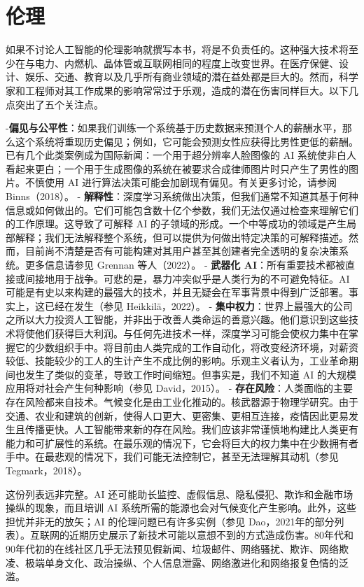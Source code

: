 \section{伦理}
如果不讨论人工智能的伦理影响就撰写本书，将是不负责任的。这种强大技术将至少在与电力、内燃机、晶体管或互联网相同的程度上改变世界。在医疗保健、设计、娱乐、交通、教育以及几乎所有商业领域的潜在益处都是巨大的。然而，科学家和工程师对其工作成果的影响常常过于乐观，造成的潜在伤害同样巨大。以下几点突出了五个关注点。

-\textbf{偏见与公平性}：如果我们训练一个系统基于历史数据来预测个人的薪酬水平，那么这个系统将重现历史偏见；例如，它可能会预测女性应获得比男性更低的薪酬。已有几个此类案例成为国际新闻：一个用于超分辨率人脸图像的 AI 系统使非白人看起来更白；一个用于生成图像的系统在被要求合成律师图片时只产生了男性的图片。不慎使用 AI 进行算法决策可能会加剧现有偏见。有关更多讨论，请参阅 Binns（2018）。
- \textbf{解释性}：深度学习系统做出决策，但我们通常不知道其基于何种信息或如何做出的。它们可能包含数十亿个参数，我们无法仅通过检查来理解它们的工作原理。这导致了可解释 AI 的子领域的形成。一个中等成功的领域是产生局部解释；我们无法解释整个系统，但可以提供为何做出特定决策的可解释描述。然而，目前尚不清楚是否有可能构建对其用户甚至其创建者完全透明的复杂决策系统。更多信息请参见 Grennan 等人（2022）。
- \textbf{武器化 AI}：所有重要技术都被直接或间接地用于战争。可悲的是，暴力冲突似乎是人类行为的不可避免特征。AI 可能是有史以来构建的最强大的技术，并且无疑会在军事背景中得到广泛部署。事实上，这已经在发生（参见 Heikkilä，2022）。
- \textbf{集中权力}：世界上最强大的公司之所以大力投资人工智能，并非出于改善人类命运的善意兴趣。他们意识到这些技术将使他们获得巨大利润。与任何先进技术一样，深度学习可能会使权力集中在掌握它的少数组织手中。将目前由人类完成的工作自动化，将改变经济环境，对薪资较低、技能较少的工人的生计产生不成比例的影响。乐观主义者认为，工业革命期间也发生了类似的变革，导致工作时间缩短。但事实是，我们不知道 AI 的大规模应用将对社会产生何种影响（参见 David，2015）。
- \textbf{存在风险}：人类面临的主要存在风险都来自技术。气候变化是由工业化推动的。核武器源于物理学研究。由于交通、农业和建筑的创新，使得人口更大、更密集、更相互连接，疫情因此更易发生且传播更快。人工智能带来新的存在风险。我们应该非常谨慎地构建比人类更有能力和可扩展性的系统。在最乐观的情况下，它会将巨大的权力集中在少数拥有者手中。在最悲观的情况下，我们可能无法控制它，甚至无法理解其动机（参见 Tegmark，2018）。

这份列表远非完整。AI 还可能助长监控、虚假信息、隐私侵犯、欺诈和金融市场操纵的现象，而且培训 AI 系统所需的能源也会对气候变化产生影响。此外，这些担忧并非无的放矢；AI 的伦理问题已有许多实例（参见 Dao，2021年的部分列表）。互联网的近期历史展示了新技术可能以意想不到的方式造成伤害。80年代和90年代初的在线社区几乎无法预见假新闻、垃圾邮件、网络骚扰、欺诈、网络欺凌、极端单身文化、政治操纵、个人信息泄露、网络激进化和网络报复色情的泛滥。

